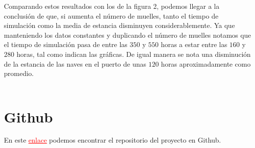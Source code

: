 \documentclass[twoside]{article}
\begin{document}
Comparando estos resultados con los de la figura 2, podemos llegar a la conclusi\'on de que, si aumenta el n\'umero de muelles, tanto el tiempo de simulaci\'on como la media de estancia disminuyen considerablemente. Ya que manteniendo los datos constantes y duplicando el n\'umero de muelles notamos que el tiempo de simulaci\'on pasa de entre las $350$ y $550$ horas a estar entre las $160$ y $280$ horas, tal como indican las gr\'aficas. De igual manera se nota una disminuci\'on de la estancia de las naves en el puerto de unas $120$ horas aproximadamente como promedio.\\\\

\section{Github}
En este \href{https://github.com/Alexx-4/Overloaded-Harbor.git}{\textcolor{red}{\underline{enlace}}} podemos encontrar el repositorio del proyecto en Github.
\end{document}
